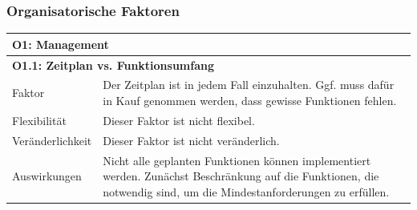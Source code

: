 \documentclass[fontsize=12pt,paper=a4,twoside]{scrartcl}
\begin{document}
\subsubsection{Organisatorische Faktoren}
\begin{tabularx}{\textwidth}{|l|X|}
\hline
\multicolumn{2}{|l|}{\textbf{O1: Management}}\\\hline
\multicolumn{2}{|l|}{\textbf{O1.1: Zeitplan vs. Funktionsumfang}}\\\hline
 Faktor & Der Zeitplan ist in jedem Fall einzuhalten. Ggf. muss dafür in Kauf genommen werden, dass gewisse Funktionen fehlen. \\\hline
 Flexibilität & Dieser Faktor ist nicht flexibel.\\\hline
 Veränderlichkeit & Dieser Faktor ist nicht veränderlich.\\\hline
 Auswirkungen & Nicht alle geplanten Funktionen können implementiert werden. Zunächst Beschränkung auf die Funktionen, die notwendig sind, um die Mindestanforderungen zu erfüllen.\\\hline
\end{tabularx}

\newpage
\end{document}
